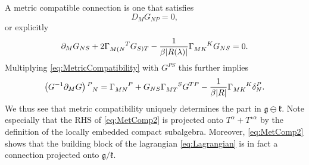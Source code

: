 
A metric compatible connection is one that satisfies 
\begin{equation}
    D_M G_{NP} = 0,
\end{equation}
or explicitly
\begin{equation}\label{eq:MetricCompatibility}
    \pd_M G_{NS} + 2\tensor{\Gamma}{_{M(N}^T}G_{S)T}-\frac{1}{\beta |R(\lambda)|}\tensor{\Gamma}{_{MK}^K}G_{NS}=0.
\end{equation}
Multiplying \eqref{eq:MetricCompatibility} with $G^{PS}$ this further implies 
\begin{equation}\label{eq:MetComp2}
    \left(G^{-1}\pd_MG\right)\tensor{}{^P_N} = \tensor{\Gamma}{_{MN}^P}+G_{NS}\tensor{\Gamma}{_{MT}^S}G^{TP}-\frac{1}{\beta |R|}\tensor{\Gamma}{_{MK}^K}\delta^P_N.
\end{equation}
We thus see that metric compatibility uniquely determines the part in $\mathfrak{g}\ominus\mathfrak{k}$. Note especially that the RHS of \eqref{eq:MetComp2} is projected onto $T^\alpha+T^{\star\alpha}$ by the definition of the locally embedded compact subalgebra. Moreover, \eqref{eq:MetComp2} shows that the building block of the lagrangian \eqref{eq:Lagrangian} is in fact a connection projected onto $\mathfrak{g}/\mathfrak{k}$. 

